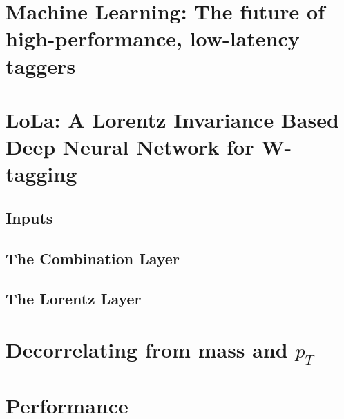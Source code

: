 \section{Machine Learning: The future of high-performance, low-latency taggers}
\section{LoLa: A Lorentz Invariance Based Deep Neural Network for W-tagging}
\subsection{Inputs}
\subsection{The Combination Layer}
\subsection{The Lorentz Layer}
\section{Decorrelating from mass and $p_{T}$}
\section{Performance}